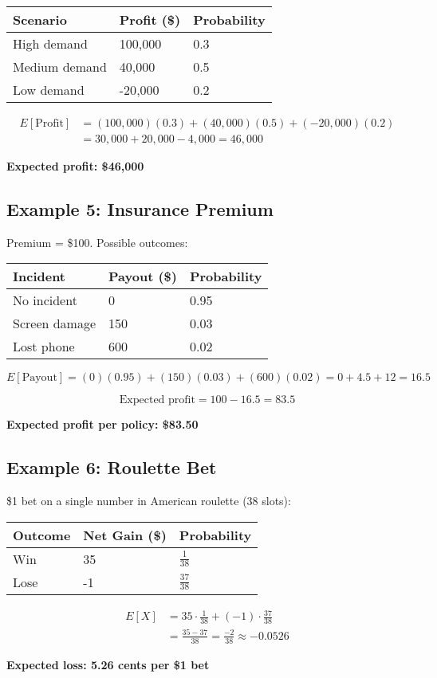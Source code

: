 \documentclass[12pt]{article}
\begin{document}
\begin{tabular}{lll}
\toprule
Scenario & Profit (\$) & Probability \\
\midrule
High demand & 100{,}000 & 0.3 \\
Medium demand & 40{,}000 & 0.5 \\
Low demand & -20{,}000 & 0.2 \\
\bottomrule
\end{tabular}

\[
\begin{aligned}
E[\text{Profit}] &= (100{,}000)(0.3) + (40{,}000)(0.5) + (-20{,}000)(0.2) \\
&= 30{,}000 + 20{,}000 - 4{,}000 = 46{,}000
\end{aligned}
\]

\textbf{Expected profit: \$46,000}

\subsection*{Example 5: Insurance Premium}

Premium = \$100. Possible outcomes:

\begin{tabular}{lll}
\toprule
Incident & Payout (\$) & Probability \\
\midrule
No incident & 0 & 0.95 \\
Screen damage & 150 & 0.03 \\
Lost phone & 600 & 0.02 \\
\bottomrule
\end{tabular}

\[
E[\text{Payout}] = (0)(0.95) + (150)(0.03) + (600)(0.02) = 0 + 4.5 + 12 = 16.5
\]

\[
\text{Expected profit} = 100 - 16.5 = 83.5
\]

\textbf{Expected profit per policy: \$83.50}

\subsection*{Example 6: Roulette Bet}

\$1 bet on a single number in American roulette (38 slots):

\begin{tabular}{lll}
\toprule
Outcome & Net Gain (\$) & Probability \\
\midrule
Win & 35 & \(\frac{1}{38}\) \\
Lose & -1 & \(\frac{37}{38}\) \\
\bottomrule
\end{tabular}

\[
\begin{aligned}
E[X] &= 35 \cdot \frac{1}{38} + (-1) \cdot \frac{37}{38} \\
&= \frac{35 - 37}{38} = \frac{-2}{38} \approx -0.0526
\end{aligned}
\]

\textbf{Expected loss: 5.26 cents per \$1 bet}
\end{document}
